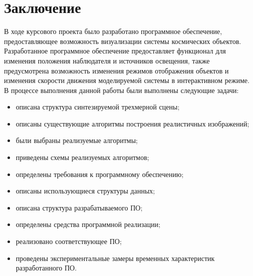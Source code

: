 \chapter*{Заключение}

В ходе курсового проекта было разработано программное обеспечение, предоставляющее возможность визуализации системы космических объектов. Разработанное программное обеспечение предоставляет функционал для изменения положения наблюдателя и источников освещения, также предусмотрена возможность изменения режимов отображения объектов и изменения скорости движения моделируемой системы в интерактивном режиме. В процессе выполнения данной работы были выполнены следующие задачи:

\begin{itemize}
    \item описана структура синтезируемой трехмерной сцены;
    \item описаны существующие алгоритмы построения реалистичных изображений;
    \item были выбраны реализуемые алгоритмы;
    \item приведены схемы реализуемых алгоритмов;
    \item определены требования к программному обеспечению;
	\item описаны использующиеся структуры данных;
	\item описана структура разрабатываемого ПО;
	\item определены средства программной реализации;
	\item реализовано соответствующее ПО;
	\item проведены экспериментальные замеры временных характеристик разработанного ПО.
\end{itemize}
